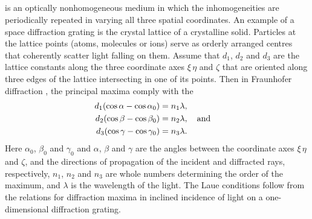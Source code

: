 \subsection{}\label{33.4.1}  is an optically nonhomogeneous medium in which the inhomogeneities are periodically repeated in varying all three spatial coordinates. An example of a space diffraction grating is the crystal lattice of a crystalline solid. Particles at the lattice points (atoms, molecules or ions) serve as orderly arranged centres that coherently scatter light falling on them. Assume that $d_{1}$, $d_{2}$ and $d_{3}$ are the lattice constants along the three coordinate axes $\xi  \, \eta $ and $\zeta$ that are oriented along three edges of the lattice intersecting in one of its points. Then in Fraunhofer diffraction , the principal maxima comply with the 
\begin{align*}%
d_{1} (\cos \alpha - \cos \alpha_{0}) & = n_{1} \lambda,\\
d_{2} (\cos \beta - \cos \beta_{0}) & = n_{2} \lambda, \qand \\
d_{3} (\cos \gamma - \cos \gamma_{0}) & = n_{3} \lambda .
\end{align*}
Here $\alpha_{0}$, $\beta_{0}$ and $\gamma_{0}$ and $\alpha$, $\beta$ and $\gamma$ are the angles between the coordinate
axes $\xi  \, \eta $ and $\zeta$, and the directions of propagation of the incident and diffracted rays, respectively, $n_{1}$, $n_{2}$ and $n_{3}$ are whole numbers determining the order of the maximum, and $\lambda$ is the wavelength of the light. The Laue conditions follow from the relations  for diffraction maxima in inclined incidence of
light on a one-dimensional diffraction grating.

